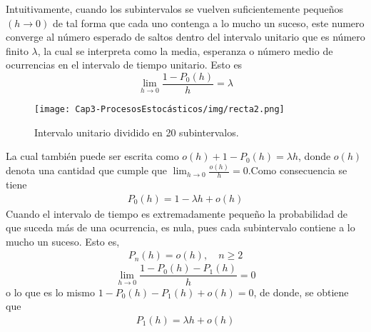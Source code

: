     Intuitivamente, cuando los subintervalos se vuelven suficientemente pequeños $(h\rightarrow 0)$ de tal forma que cada uno contenga a lo mucho un suceso, este numero converge al número esperado de saltos dentro del intervalo unitario que es número finito $\lambda$, la cual se interpreta como la media, esperanza o número medio de ocurrencias en el intervalo de tiempo unitario.
    Esto es
    $$  \lim_{h\rightarrow 0}\frac{1-P_0(h)}{h}=\lambda
    $$
    \begin{center}
        \begin{figure}[htb]
               \texttt{[image: Cap3-ProcesosEstocásticos/img/recta2.png]}
               \caption{Intervalo unitario dividido en 20 subintervalos.}
        \label{figurarecta2}
        \vspace*{0.05in}
        \end{figure}
    \end{center}
    \begin{comment}
    $X([a,b])$ es el número de ocurrencias en el intervalo $[a,b]$, sean $w_i$ el tiempo de espera antes de que pase una ocurrencia adicional después de la $i$-ésima ocurrencia.
    Dado $\epsilon>0$, se toma $\delta=\min\{w_i, i=1,2,\ldots,\lambda\}$, si $|h|<\delta$ , $X([(i-1)h,ih])$, $i=1,2,\ldots\lambda$ a lo mucho puede ser 1. entonces $1-P_0(h)=P_1(h)$ $|\frac{(1-P_0(h))}{h}-\lambda|=|N(P_1(h))-\lambda|=|N\frac{\lambda}{N}-\lambda|=0<\epsilon $, esto es:
    \end{comment}
    La cual también puede ser escrita como $o(h)+1-P_0(h)=\lambda h$, donde $o(h)$ denota una cantidad que cumple que $\lim_{h\rightarrow 0}\frac{o(h)}{h}=0$.Como consecuencia se tiene
    \begin{eqnarray}
        P_0(h)=1-\lambda h+o(h)
        \label{procesoPoison-cond1}
    \end{eqnarray}
    Cuando el intervalo de tiempo es extremadamente pequeño la probabilidad de que suceda más de una ocurrencia, es nula, pues cada subintervalo contiene a lo mucho un suceso. Esto es,
    \begin{eqnarray}
        P_n(h)=o(h),\quad n\geq 2
        \label{procesoPoison-cond2}
    \end{eqnarray}
    $$\lim_{h\rightarrow 0}\frac{1-P_0(h)-P_1(h)}{h}=0$$
    o lo que es lo mismo $1-P_0(h)-P_1(h)+o(h)=0$, de donde, se obtiene que
    \begin{eqnarray}
        P_1(h)=\lambda h+o(h)
         \label{procesoPoison-cond3}
    \end{eqnarray}
